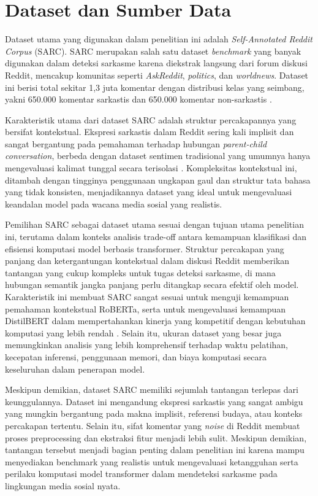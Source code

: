 \section{Dataset dan Sumber Data}

Dataset utama yang digunakan dalam penelitian ini adalah \textit{Self-Annotated Reddit Corpus} (SARC). SARC merupakan salah satu dataset \textit{benchmark} yang banyak digunakan dalam deteksi sarkasme karena diekstrak langsung dari forum diskusi Reddit, mencakup komunitas seperti \textit{AskReddit}, \textit{politics}, dan \textit{worldnews}. Dataset ini berisi total sekitar 1,3 juta komentar dengan distribusi kelas yang seimbang, yakni 650.000 komentar sarkastis dan 650.000 komentar non-sarkastis \cite{zhang2025enhancing}.

Karakteristik utama dari dataset SARC adalah struktur percakapannya yang bersifat kontekstual. Ekspresi sarkastis dalam Reddit sering kali implisit dan sangat bergantung pada pemahaman terhadap hubungan \textit{parent-child conversation}, berbeda dengan dataset sentimen tradisional yang umumnya hanya mengevaluasi kalimat tunggal secara terisolasi \cite{dubey2025unpacking}. Kompleksitas kontekstual ini, ditambah dengan tingginya penggunaan ungkapan gaul dan struktur tata bahasa yang tidak konsisten, menjadikannya dataset yang ideal untuk mengevaluasi keandalan model pada wacana media sosial yang realistis.

Pemilihan SARC sebagai dataset utama sesuai dengan tujuan utama penelitian ini, terutama dalam konteks analisis trade-off antara kemampuan klasifikasi dan efisiensi komputasi model berbasis transformer. Struktur percakapan yang panjang dan ketergantungan kontekstual dalam diskusi Reddit memberikan tantangan yang cukup kompleks untuk tugas deteksi sarkasme, di mana hubungan semantik jangka panjang perlu ditangkap secara efektif oleh model. Karakteristik ini membuat SARC sangat sesuai untuk menguji kemampuan pemahaman kontekstual RoBERTa, serta untuk mengevaluasi kemampuan DistilBERT dalam mempertahankan kinerja yang kompetitif dengan kebutuhan komputasi yang lebih rendah \cite{dubey2025unpacking}. Selain itu, ukuran dataset yang besar juga memungkinkan analisis yang lebih komprehensif terhadap waktu pelatihan, kecepatan inferensi, penggunaan memori, dan biaya komputasi secara keseluruhan dalam penerapan model.

Meskipun demikian, dataset SARC memiliki sejumlah tantangan terlepas dari keunggulannya. Dataset ini mengandung ekspresi sarkastis yang sangat ambigu yang mungkin bergantung pada makna implisit, referensi budaya, atau konteks percakapan tertentu. Selain itu, sifat komentar yang \textit{\textit{noise}} di Reddit membuat proses preprocessing dan ekstraksi fitur menjadi lebih sulit. Meskipun demikian, tantangan tersebut menjadi bagian penting dalam penelitian ini karena mampu menyediakan benchmark yang realistis untuk mengevaluasi ketangguhan serta perilaku komputasi model transformer dalam mendeteksi sarkasme pada lingkungan media sosial nyata.

